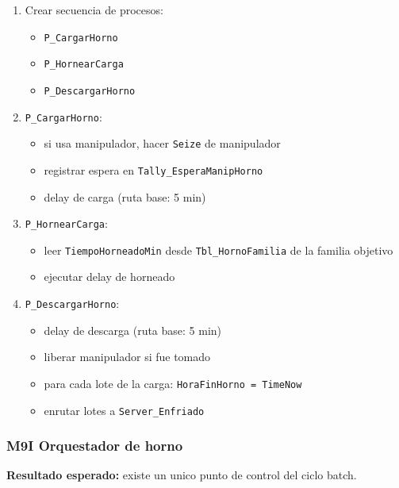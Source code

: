 \documentclass[11pt]{article}
\newcommand{\simio}[1]{\texttt{#1}}
\newcommand{\tabla}[1]{\texttt{#1}}
\newcommand{\state}[1]{\texttt{#1}}
\newcommand{\proc}[1]{\texttt{#1}}
\begin{document}
\begin{enumerate}
  \item Crear secuencia de procesos:
  \begin{itemize}
    \item \proc{P\_CargarHorno}
    \item \proc{P\_HornearCarga}
    \item \proc{P\_DescargarHorno}
  \end{itemize}
  \item \proc{P\_CargarHorno}:
  \begin{itemize}
    \item si usa manipulador, hacer \simio{Seize} de manipulador
    \item registrar espera en \simio{Tally\_EsperaManipHorno}
    \item delay de carga (ruta base: 5 min)
  \end{itemize}
  \item \proc{P\_HornearCarga}:
  \begin{itemize}
    \item leer \state{TiempoHorneadoMin} desde \tabla{Tbl\_HornoFamilia} de la familia objetivo
    \item ejecutar delay de horneado
  \end{itemize}
  \item \proc{P\_DescargarHorno}:
  \begin{itemize}
    \item delay de descarga (ruta base: 5 min)
    \item liberar manipulador si fue tomado
    \item para cada lote de la carga: \state{HoraFinHorno = TimeNow}
    \item enrutar lotes a \simio{Server\_Enfriado}
  \end{itemize}
\end{enumerate}

\subsubsection{M9I Orquestador de horno}
\textbf{Resultado esperado:} existe un unico punto de control del ciclo batch.
\end{document}
